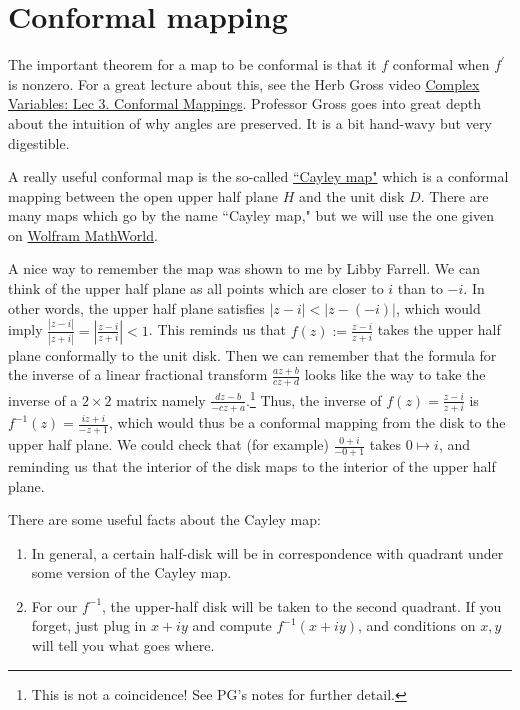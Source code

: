 \documentclass[10pt]{article}
\begin{document}

\section{Conformal mapping}

The important theorem for a map to be conformal is that it $f$ conformal when $f^\prime$ is nonzero. For a great lecture about this, see the Herb Gross video \href{https://www.youtube.com/watch?v=s1DFa1dCss0}{Complex Variables: Lec 3. Conformal Mappings}. Professor Gross goes into great depth about the intuition of why angles are preserved. It is a bit hand-wavy but very digestible. 

A really useful conformal map is the so-called \href{http://www-users.math.umn.edu/~garrett/m/complex/notes_2014-15/07_conformal_mapping.pdf}{``Cayley map"} which is a conformal mapping between the open upper half plane $H$ and the unit disk $D$. There are many maps which go by the name ``Cayley map," but we will use the one given on \href{https://mathworld.wolfram.com/CayleyTransform.html}{Wolfram MathWorld}.

A nice way to remember the map was shown to me by Libby Farrell. 
We can think of the upper half plane as all points which are closer to $i$ than to $-i$. 
In other words, the upper half plane satisfies $| z - i | < |z- (-i)|$, which would imply $\frac{|z-i|}{|z+i|}  = \left | \frac{z-i}{z+i} \right |< 1$. 
This reminds us that $f(z) := \frac{z-i}{z+i}$ takes the upper half plane conformally to the unit disk. 
Then we can remember that the formula for the inverse of a linear fractional transform $\frac{az + b}{cz+d}$ looks like the way to take the inverse of a $2\times 2$ matrix namely $\frac{dz - b}{-cz + a}$.\footnote{This is not a coincidence! See PG's notes for further detail.} 
Thus, the inverse of $f(z) = \frac{z-i}{z+i}$ is $f^{-1}(z) = \frac{iz + i}{-z+1}$, which would thus be a conformal mapping from the disk to the upper half plane. We could check that (for example) $\frac{0+i}{-0+1}$ takes $0 \mapsto i$, and reminding us that the interior of the disk maps to the interior of the upper half plane.

There are some useful facts about the Cayley map:
\begin{enumerate}
	\item In general, a certain half-disk will be in correspondence with quadrant under some version of the Cayley map.
	\item For our $f^{-1}$, the upper-half disk will be taken to the second quadrant. If you forget, just plug in $x+iy$ and compute $f^{-1}(x+iy)$, and conditions on $x,y$ will tell you what goes where.
\end{enumerate}
\end{document}
